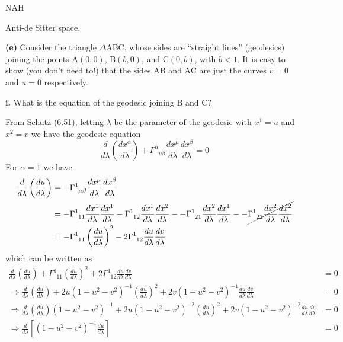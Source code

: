 \documentclass[a4paper]{article} %
\newcommand{\ph}[1]{\phantom{#1}}
\begin{document}
NAH

Anti-de Sitter space.


\begin{framed}
\textbf{(e)} Consider the triangle $\Delta$ABC, whose sides are ``straight lines'' (geodesics) joining the points A$(0,0)$, B$(b,0)$, and C$(0,b)$, with $b<1$. It is easy to show (you don't need to!) that the sides AB and AC are just the curves $v=0$ and $u=0$ respectively.
\end{framed}

\begin{framed}
\textbf{i.} What is the equation of the geodesic joining B and C?
\end{framed}

From Schutz (6.51), letting $\lambda$ be the parameter of the geodesic with $x^1=u$ and $x^2=v$ we have the geodesic equation
\begin{equation}
\frac{d}{d\lambda}\left(\frac{dx^{\alpha}}{d\lambda}\right)+\Gamma^{\alpha}_{\ph{\alpha}\mu\beta}
\frac{dx^{\mu}}{d\lambda}\frac{dx^{\beta}}{d\lambda}=0
\end{equation}
For $\alpha=1$ we have
\begin{align}
\frac{d}{d\lambda}\left(\frac{du}{d\lambda}\right)&=-\Gamma^{1}_{\ph{1}\mu\beta}
\frac{dx^{\mu}}{d\lambda}\frac{dx^{\beta}}{d\lambda}\\
&=-\Gamma^{1}_{\ph{1}11}\frac{dx^{1}}{d\lambda}\frac{dx^{1}}{d\lambda}
-\Gamma^{1}_{\ph{1}12}\frac{dx^{1}}{d\lambda}\frac{dx^{2}}{d\lambda}-
-\Gamma^{1}_{\ph{1}21}\frac{dx^{2}}{d\lambda}\frac{dx^{1}}{d\lambda}-
-\cancel{\Gamma^{1}_{\ph{1}22}\frac{dx^{2}}{d\lambda}\frac{dx^{2}}{d\lambda}}\\
&=-\Gamma^{1}_{\ph{1}11}\left(\frac{du}{d\lambda}\right)^2
-2\Gamma^{1}_{\ph{1}12}\frac{du}{d\lambda}\frac{dv}{d\lambda}
\end{align}
which can be written as
\begin{align}
\frac{d}{d\lambda}\left(\frac{du}{d\lambda}\right)+
\Gamma^{1}_{\ph{1}11}\left(\frac{du}{d\lambda}\right)^2
+2\Gamma^{1}_{\ph{1}12}\frac{du}{d\lambda}\frac{dv}{d\lambda}&=0\\
\Rightarrow \frac{d}{d\lambda}\left(\frac{du}{d\lambda}\right)+
2u(1-u^2-v^2)^{-1}\left(\frac{du}{d\lambda}\right)^2
+2v(1-u^2-v^2)^{-1}\frac{du}{d\lambda}\frac{dv}{d\lambda}&=0\label{geodes chris0}\\
\Rightarrow \frac{d}{d\lambda}\left(\frac{du}{d\lambda}\right)(1-u^2-v^2)^{-1}+
2u(1-u^2-v^2)^{-2}\left(\frac{du}{d\lambda}\right)^2
+2v(1-u^2-v^2)^{-2}\frac{du}{d\lambda}\frac{dv}{d\lambda}&=0\label{geodes chris1}\\
\Rightarrow \frac{d}{d\lambda}\left[(1-u^2-v^2)^{-1}\frac{du}{d\lambda}\right]&=0 \label{geodes chris2}
\end{align}
\end{document}
